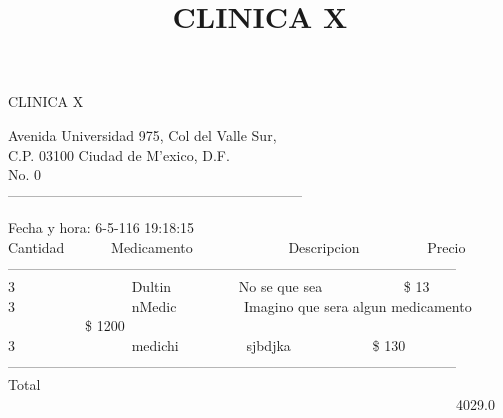 \documentclass[10pt,a4paper]{letter}
\title{\bf CLINICA X}
\begin{document}
\begin{center}
{\scshape\LARGE CLINICA X\par}
{Avenida Universidad 975, Col del Valle Sur,\\}
{C.P. 03100 Ciudad de M'exico, D.F.}\\ 
{No. 0}\\ 
---------------------------------------------------------------
\end{center}

Fecha y hora: 6-5-116 19:18:15\\

Cantidad \ \ \ \ \ \ Medicamento \ \ \ \ \ \ \ \ \ \ \ \ \  Descripcion  \ \ \ \ \ \ \ \ \ Precio \\
------------------------------------------------------------------------------------------------ \\
3 \ \ \ \ \ \ \ \ \ \ \ \ \ \ \ \ Dultin \ \ \ \ \ \ \ \ \ No se que sea \ \ \ \ \ \ \ \ \ \ \ \$ 13 \\
3 \ \ \ \ \ \ \ \ \ \ \ \ \ \ \ \ nMedic \ \ \ \ \ \ \ \ \ Imagino que sera algun medicamento \ \ \ \ \ \ \ \ \ \ \ \$ 1200 \\
3 \ \ \ \ \ \ \ \ \ \ \ \ \ \ \ \ medichi \ \ \ \ \ \ \ \ \ sjbdjka \ \ \ \ \ \ \ \ \ \ \ \$ 130 \\

------------------------------------------------------------------------------------------------ \\
Total	\ \ \ \ \ \ \ \ \ \ \ \ \  \ \ \ \ \ \ \ \ \ \ \ \ \ \ \ \ \ \ \ \ \ \ \ \ \ \ \ \ \ \ \ \ \ \ \ \ \ \ \ \ \  \ \ \ \ \ \ \ \ \ \ 4029.0 \\
 
\end{document}
